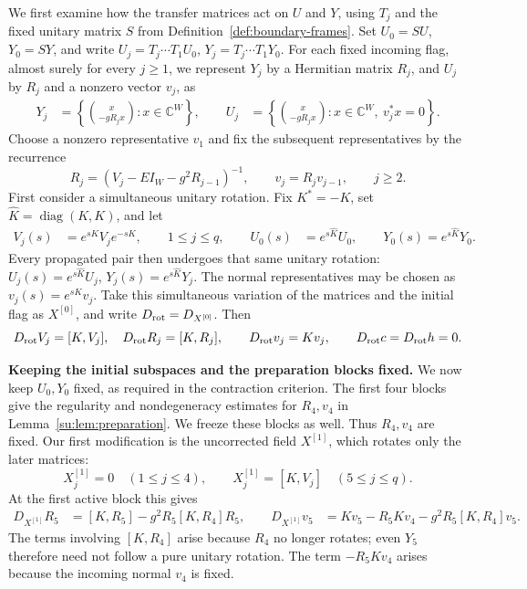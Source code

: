 \documentclass[11pt]{article}
\numberwithin{equation}{section}
\theoremstyle{remark}
\newcommand{\C}{\mathbb C}
\begin{document}
We first examine how the transfer matrices act on $U$ and $Y$,
using $T_j$ and the fixed unitary matrix $S$ from
Definition~\ref{def:boundary-frames}. Set $U_0=SU$, $Y_0=SY$, and write
$U_j=T_j\cdots T_1U_0$, $Y_j=T_j\cdots T_1Y_0$.
For each fixed incoming flag, almost surely for every $j\ge1$,
we represent $Y_j$ by a Hermitian matrix $R_j$, and $U_j$ by
$R_j$ and a nonzero vector $v_j$, as
 \[
 \begin{aligned}
 Y_j&=\left\{\binom{x}{-gR_jx}:x\in\C^W\right\},\qquad U_j&=\left\{\binom{x}{-gR_jx}:x\in\C^W,\ v_j^*x=0\right\}.
 \end{aligned}
\]
Choose a nonzero representative $v_1$ and fix the subsequent
representatives by the recurrence
\[
 R_j=(V_j-EI_W-g^2R_{j-1})^{-1},\qquad
 v_j=R_jv_{j-1},\qquad j\ge2.
\]
First consider a simultaneous unitary rotation. Fix $K^*=-K$,
set $\widehat K=\operatorname{diag}(K,K)$, and let
\[
 \begin{aligned}
 V_j(s)&=e^{sK}V_je^{-sK},\qquad 1\le j\le q,\qquad
 U_0(s)&=e^{s\widehat K}U_0,\qquad
 Y_0(s)=e^{s\widehat K}Y_0.
 \end{aligned}
\]
Every propagated pair then undergoes that same unitary rotation:
$U_j(s)=e^{s\widehat K}U_j$, $Y_j(s)=e^{s\widehat K}Y_j$.
The normal representatives may be chosen as $v_j(s)=e^{sK}v_j$.
Take this simultaneous variation of the matrices and the initial
flag as $X^{[0]}$, and write $D_{\rm rot}=D_{X^{[0]}}$. Then
\[
 D_{\rm rot} V_j= [K, V_j],\quad D_{\rm rot}R_j=[K,R_j],\qquad
 D_{\rm rot}v_j=Kv_j,\qquad
 D_{\rm rot}c=D_{\rm rot}h=0.
\]

\textbf{Keeping the initial subspaces and the preparation blocks fixed.}
We now keep $U_0,Y_0$ fixed, as required in the contraction
criterion. The first four blocks give the regularity and nondegeneracy
estimates for $R_4,v_4$ in Lemma~\ref{su:lem:preparation}.
We freeze these blocks as well. Thus
$R_4,v_4$ are fixed. Our first modification is the uncorrected
field $X^{[1]}$, which rotates only the later matrices:
\[
 X^{[1]}_j=0\quad(1\le j\le4),\qquad
X^{[1]}_j=[K,V_j]\quad(5\le j\le q).
\]
At the first active block this gives
\[
 \begin{aligned}
 D_{X^{[1]}}R_5&=[K,R_5]-g^2R_5[K,R_4]R_5,\qquad
 D_{X^{[1]}}v_5&=Kv_5-R_5Kv_4-g^2R_5[K,R_4]v_5.
 \end{aligned}
\]
The terms involving $[K, R_4]$ arise because $R_4$ no longer
rotates; even $Y_5$ therefore need not follow a pure unitary
rotation. The term $-R_5Kv_4$ arises because the incoming normal
$v_4$ is fixed.
\end{document}
